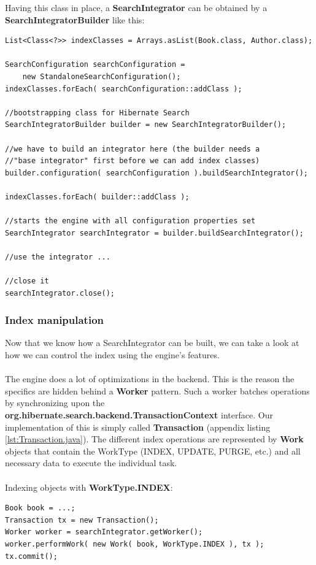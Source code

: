 \pagebreak
\noindent
Having this class in place, a \textbf{SearchIntegrator} can be obtained by a \textbf{SearchIntegratorBuilder} like this:
\\
\lstset{language=java}
\begin{lstlisting}[frame=htrbl, caption={Starting up the engine}, label={lst:starting_up_engine.java}]
List<Class<?>> indexClasses = Arrays.asList(Book.class, Author.class);

SearchConfiguration searchConfiguration = 
	new StandaloneSearchConfiguration();
indexClasses.forEach( searchConfiguration::addClass );

//bootstrapping class for Hibernate Search
SearchIntegratorBuilder builder = new SearchIntegratorBuilder();

//we have to build an integrator here (the builder needs a 
//"base integrator" first before we can add index classes)
builder.configuration( searchConfiguration ).buildSearchIntegrator();

indexClasses.forEach( builder::addClass );

//starts the engine with all configuration properties set
SearchIntegrator searchIntegrator = builder.buildSearchIntegrator();

//use the integrator ...

//close it
searchIntegrator.close();
\end{lstlisting}

\pagebreak

\subsubsection{Index manipulation} \label{index_manipulation_integrator}

Now that we know how a SearchIntegrator can be built, we can take a look at how we can control the index using the engine's features. 
\\\\
The engine does a lot of optimizations in the backend. This is the reason the specifics are hidden behind a \textbf{Worker} pattern. Such a worker batches operations by synchronizing upon the \textbf{org.hibernate.search.backend.TransactionContext} interface. Our implementation of this is simply called \textbf{Transaction} (appendix listing \ref{lst:Transaction.java}). The different index operations are represented by \textbf{Work} objects that contain the WorkType (INDEX, UPDATE, PURGE, etc.) and all necessary data to execute the individual task.
\\\\
Indexing objects with \textbf{WorkType.INDEX}:
\\
\lstset{language=java}
\begin{lstlisting}[frame=htrbl, caption={Indexing an object with the engine}, label={lst:indexing_object_native.java}]
Book book = ...;
Transaction tx = new Transaction();
Worker worker = searchIntegrator.getWorker();
worker.performWork( new Work( book, WorkType.INDEX ), tx );
tx.commit();
\end{lstlisting}

